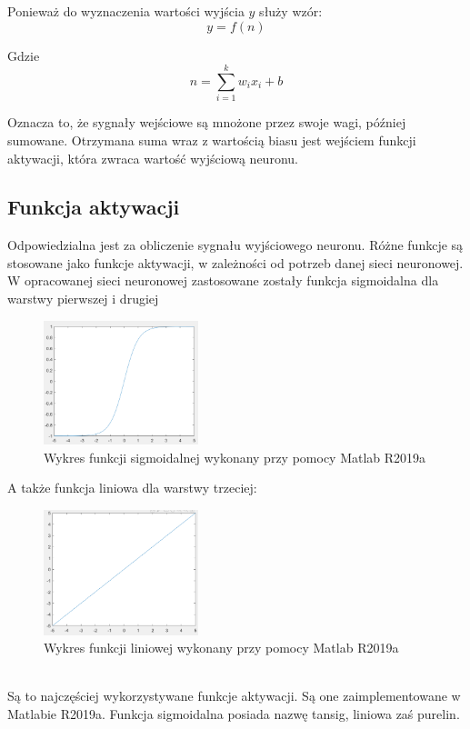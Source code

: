 \documentclass[a4paper, openright, twoside,11pt]{article}
\begin{document}
    Ponieważ do wyznaczenia wartości wyjścia $y$ służy wzór:
    \begin{equation}\label{fun_aktywacji}
    y = f(n)
    \end{equation}
    
    Gdzie
    \begin{equation} \label{pobudzenieNeuronu}
    n = \sum_{i=1}^k w_i x_i + b
    \end{equation}
    
    Oznacza to, że sygnały wejściowe są mnożone przez swoje wagi, później sumowane. Otrzymana suma wraz z wartością biasu jest wejściem funkcji aktywacji, która zwraca wartość wyjściową neuronu.
    
    \subsection{Funkcja aktywacji}
    Odpowiedzialna jest za obliczenie sygnału wyjściowego neuronu. Różne funkcje są stosowane jako funkcje aktywacji, w zależności od potrzeb danej sieci neuronowej.
    W opracowanej sieci neuronowej zastosowane zostały funkcja sigmoidalna dla warstwy pierwszej i drugiej\\
    \begin{figure}[h]
        \centering
        \includegraphics[width=0.4\textwidth]{Grafika/simgoidalna.png}
        \caption{Wykres funkcji sigmoidalnej wykonany przy pomocy Matlab R2019a}
        \label{fig:sigmoidalna}
    \end{figure}
    
    A także funkcja liniowa dla warstwy trzeciej:\\
    \begin{figure}[h]
        \centering
        \includegraphics[width=0.4\textwidth]{Grafika/liniowa.png}
        \caption{Wykres funkcji liniowej wykonany przy pomocy Matlab R2019a}
        \label{fig:liniowa}
    \end{figure}\\
    Są to najczęściej wykorzystywane funkcje aktywacji. Są one zaimplementowane w Matlabie R2019a. Funkcja sigmoidalna posiada nazwę tansig, liniowa zaś purelin.
    
\end{document}
